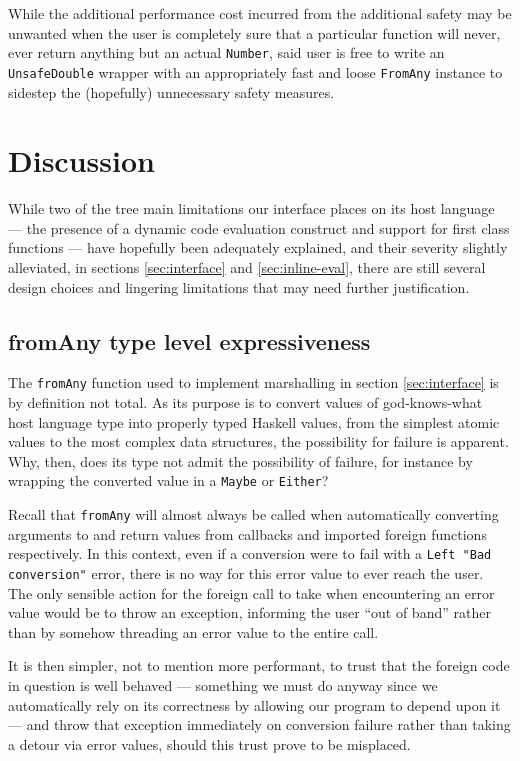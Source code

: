 \documentclass[preprint]{sigplanconf}
\begin{document}
While the additional performance cost incurred from the additional safety may
be unwanted when the user is completely sure that a particular function
will never, ever return anything but an actual \lstinline!Number!, said user
is free to write an \lstinline!UnsafeDouble! wrapper with an appropriately
fast and loose \lstinline!FromAny! instance to sidestep the (hopefully)
unnecessary safety measures.

\section{Discussion}\label{sec:discussion}
While two of the tree main limitations our interface places on its host
language --- the presence of a dynamic code evaluation construct and support for
first class functions --- have hopefully been adequately explained, and their
severity slightly alleviated, in sections \ref{sec:interface} and
\ref{sec:inline-eval}, there are still several design choices and lingering
limitations that may need further justification.

\subsection{fromAny type level expressiveness}
The \lstinline!fromAny! function used to implement marshalling in section
\ref{sec:interface} is by definition not total. As its purpose is to
convert values of god-knows-what host language type into properly typed Haskell
values, from the simplest atomic values to the most complex data structures,
the possibility for failure is apparent. Why, then, does its type not admit
the possibility of failure, for instance by wrapping the converted value in a
\lstinline!Maybe! or \lstinline!Either!?

Recall that \lstinline!fromAny! will almost always be called when
automatically converting arguments to and return values from callbacks and
imported foreign functions respectively. In this context, even if a conversion
were to fail with a \lstinline!Left "Bad conversion"! error, there is no way
for this error value to ever reach the user. The only sensible action for the
foreign call to take when encountering an error value would be to throw an
exception, informing the user ``out of band'' rather than by somehow threading
an error value to the entire call.

It is then simpler, not to mention more performant, to trust that the foreign
code in question is well behaved --- something we must do anyway since we
automatically rely on its correctness by allowing our program to depend upon
it --- and throw that exception immediately on conversion failure rather than
taking a detour via error values, should this trust prove to be misplaced.
\end{document}
